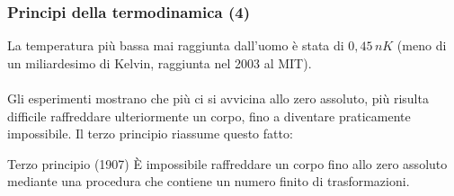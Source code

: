 \documentclass[]{beamer}
\theoremstyle{plain}
\begin{document}
\begin{frame}
  \frametitle{Principi della termodinamica (4)}
  La temperatura più bassa mai raggiunta dall'uomo è stata di $ 0,45 \, nK $ (meno di un miliardesimo di Kelvin, raggiunta nel 2003 al MIT).\pause\\~\\
  
Gli esperimenti mostrano che più ci si avvicina allo zero assoluto, più risulta difficile raffreddare ulteriormente un corpo, fino a diventare praticamente impossibile.{\pause} Il terzo principio riassume questo fatto:
  \begin{block}{Terzo principio (1907)}
    È impossibile raffreddare un corpo fino allo zero assoluto mediante una procedura che contiene un numero finito di trasformazioni.
  \end{block}
\end{frame}
\end{document}
